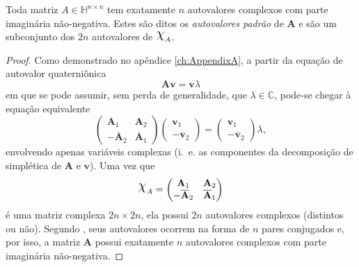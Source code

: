 \begin{theorem}
\label{th:02}
Toda matriz $ A \in \mathbb{H}^{n \times n} $ tem exatamente $ n $ autovalores complexos
com parte imagin\'aria n\~ao-negativa. Estes s\~ao ditos os \emph{autovalores padr\~ao} de $ \mathbf{A} $ e s\~ao um subconjunto dos $ 2n $ autovalores de $ \rchi_A $.
\end{theorem}

\begin{proof}
Como demonstrado no ap\^endice \ref{ch:AppendixA}, a partir da equa\c c\~ao de autovalor quaterni\^onica
\begin{equation}
\mathbf{A} \mathbf{v} = \mathbf{v} \lambda
\end{equation}
em que se pode assumir, sem perda de generalidade, que $ \lambda \in \mathbb{C} $, pode-se chegar \`a equa\c c\~ao equivalente
\begin{equation}
\begin{pmatrix}
\mathbf{A}_1 & \mathbf{A}_2\\ 
- \overline{\mathbf{A}}_2 & \overline{\mathbf{A}}_1
\end{pmatrix}
\begin{pmatrix}
\mathbf{v}_1 \\ 
- \overline{\mathbf{v}}_2
\end{pmatrix} =
\begin{pmatrix}
\mathbf{v}_1 \\ 
- \overline{\mathbf{v}}_2
\end{pmatrix}
\lambda,
\end{equation}
envolvendo apenas vari\'aveis complexas (i.~e. as componentes da decomposi\c c\~ao de simpl\'etica de $ \mathbf{A} $ e $ \mathbf{v} $). Uma vez que
\begin{equation}
\rchi_A = 
\begin{pmatrix}
\mathbf{A}_1 & \mathbf{A}_2\\ 
- \overline{\mathbf{A}}_2 & \overline{\mathbf{A}}_1
\end{pmatrix}
\end{equation}
\'e uma matriz complexa $ 2n \times 2n $, ela possui $ 2n $ autovalores complexos (distintos ou não). Segundo \cite[Teorema 5]{lee1948eigenvalues}, seus autovalores ocorrem na forma de $ n $ pares conjugados e, por isso, a matriz $ \mathbf{A} $ possui exatamente $ n $ autovalores complexos com parte imagin\'aria n\~ao-negativa.


\end{proof}
